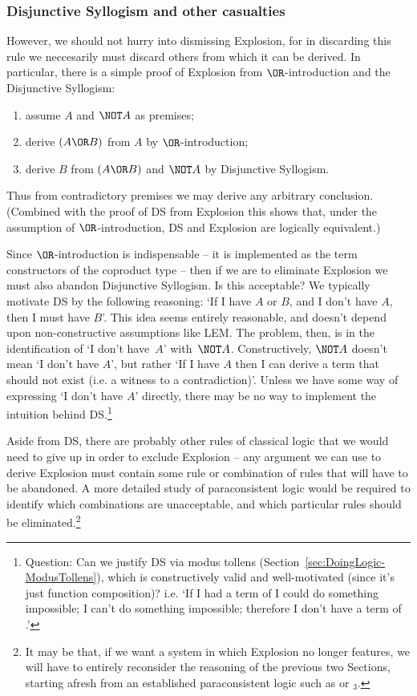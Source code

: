 \subsubsection{Disjunctive Syllogism and other casualties}

However, we should not hurry into dismissing Explosion, for in discarding this rule we neccesarily must discard others from which it can be derived.  In particular, there is a simple proof of Explosion from $\OR$-introduction and the Disjunctive Syllogism:
\begin{samepage}
\begin{enumerate}
\item assume $A$ and $\NOT A$ as premises;
\item derive $(A \OR B)$ from $A$ by $\OR$-introduction;
\item derive $B$ from $(A \OR B)$ and $\NOT A$ by Disjunctive Syllogism.
\end{enumerate}
\end{samepage}
Thus from contradictory premises we may derive any arbitrary conclusion.  (Combined with the proof of DS from Explosion this shows that, under the assumption of $\OR$-introduction, DS and Explosion are logically equivalent.)

Since $\OR$-introduction is indispensable -- it is implemented as the term constructors of the coproduct type -- then if we are to eliminate Explosion we must also abandon Disjunctive Syllogism. Is this acceptable? We typically motivate DS by the following reasoning: `If I have $A$ or $B$, and I don't have $A$, then I must have $B$'. This idea seems entirely reasonable, and doesn't depend upon non-constructive assumptions like LEM. The problem, then, is in the identification of `I don't have~$A$' with~$\NOT A$. Constructively, $\NOT A$ doesn't mean `I don't have $A$', but rather `If I have $A$ then I can derive a term that should not exist (i.e. a witness to a contradiction)'.  
Unless we have some way of expressing `I don't have $A$' directly, there may be no way to implement the intuition behind DS.\footnote{
Question: Can we justify DS via modus tollens (Section~\ref{sec:DoingLogic-ModusTollens}), which is constructively valid and well-motivated (since it's just function composition)?  i.e. `If I had a term of  I could do something impossible; I can't do something impossible; therefore I don't have a term of .'
}

Aside from DS, there are probably other rules of classical logic that we would need to give up in order to exclude Explosion -- any argument we can use to derive Explosion must contain some rule or combination of rules that will have to be abandoned.  A more detailed study of paraconsistent logic would be required to identify which combinations are unacceptable, and which particular rules should be eliminated.\footnote{It may be that, if we want a system in which Explosion no longer features, we will have to entirely reconsider the reasoning of the previous two Sections, starting afresh from an established paraconsistent logic such as  or $_3$.
}

